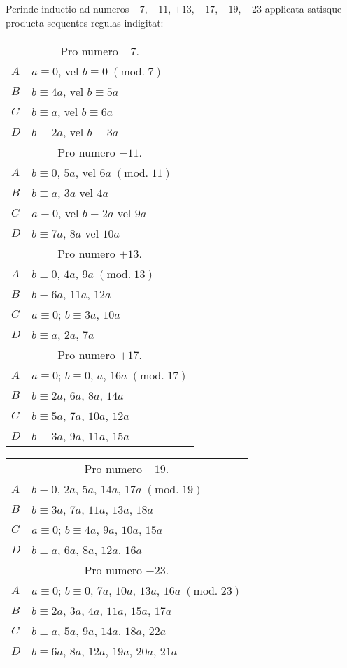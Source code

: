 \documentclass[twoside,12pt]{memoir}
\renewcommand{\pmod}[1]{\;(\textrm{mod.}\;#1)}
\begin{document}
Perinde inductio ad numeros \(-7\), \(-11\), \(+13\), \(+17\), \(-19\), \(-23\) applicata satisque producta sequentes regulas indigitat:
\begin{center}
\begin{tabular}{l|l}
\multicolumn{2}{c}{Pro numero \(-7\).}\\
\(A\) & \(a \equiv 0\), vel \(b \equiv 0\pmod{7}\) \\
\(B\) & \(b \equiv 4 a\), vel \(b \equiv 5 a\) \\
\(C\) & \(b \equiv a\), vel \(b \equiv 6 a\) \\
\(D\) & \(b \equiv 2 a\), vel \(b \equiv 3 a\) \\
\multicolumn{2}{c}{Pro numero \(-11\).}\\
\(A\) & \(b \equiv 0\), \(5 a\), vel \(6 a\pmod{11}\) \\
\(B\) & \(b \equiv a\), \(3 a\) vel \(4 a\) \\
\(C\) & \(a \equiv 0\), vel \(b \equiv 2 a\) vel \(9 a\) \\
\(D\) & \(b \equiv 7 a\), \(8 a\) vel \(10 a\) \\
\multicolumn{2}{c}{Pro numero \(+13\).}\\
\(A\) & \(b \equiv 0\), \(4a\), \(9 a\pmod{13}\) \\
\(B\) & \(b \equiv 6 a\), \(11 a\), \(12 a\) \\
\(C\) & \(a \equiv 0\); \(b \equiv 3 a\), \(10 a\) \\
\(D\) & \(b \equiv a\), \(2 a\), \(7 a\) \\
\multicolumn{2}{c}{Pro numero \(+17\).}\\
\(A\) & \(a \equiv 0\); \(b \equiv 0\), \(a\), \(16 a\pmod{17}\)\\
\(B\) & \(b \equiv 2 a\), \(6 a\), \(8 a\), \(14 a\)\\
\(C\) & \(b \equiv 5 a\), \(7 a\), \(10 a\), \(12 a\)\\
\(D\) & \(b \equiv 3 a\), \(9 a\), \(11 a\), \(15 a\)
\end{tabular}\pagebreak%

\begin{tabular}{l|l}
\multicolumn{2}{c}{Pro numero \(-19\).}\\
\(A\) & \(b \equiv 0\), \(2 a\), \(5 a\), \(14 a\), \(17 a\pmod{19} \)\\
\(B\) & \(b \equiv 3 a\), \(7 a\), \(11 a\), \(13 a\), \(18 a \)\\
\(C\) & \(a \equiv 0\); \(b \equiv 4 a\), \(9 a\), \(10 a\), \(15 a \)\\
\(D\) & \(b \equiv a\), \(6 a\), \(8 a\), \(12 a\), \(16 a\)\\
\multicolumn{2}{c}{Pro numero \(-23\).}\\
\(A\) & \(a \equiv 0\); \(b \equiv 0\), \(7 a\), \(10 a\), \(13 a\), \(16 a\pmod{23} \)\\
\(B\) & \(b \equiv 2 a\), \(3 a\), \(4 a\), \(11 a\), \(15 a\), \(17 a \)\\
\(C\) & \(b \equiv a\), \(5 a\), \(9 a\), \(14 a\), \(18 a\), \(22 a \)\\
\(D\) & \(b \equiv 6 a\), \(8 a\), \(12 a\), \(19 a\), \(20 a\), \(21 a\)
\end{tabular}
\end{center}
\end{document}
